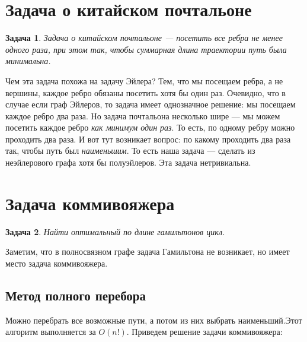 \documentclass[a4paper,12pt]{article}
\newtheorem{problem}{Задача}
\begin{document}
	\section{Задача о китайском почтальоне}
		\begin{problem}
			Задача о китайском почтальоне --- посетить все ребра не менее одного раза, при этом так, чтобы суммарная длина траектории путь была минимальна.
		\end{problem}
		Чем эта задача похожа на задачу Эйлера? Тем, что мы посещаем ребра, а не вершины, каждое ребро обязаны посетить хотя бы один раз. 
		Очевидно, что в случае если граф Эйлеров, то задача имеет однозначное решение: мы посещаем каждое ребро два раза. Но задача почтальона несколько шире --- мы можем посетить каждое ребро \emph{как минимум один раз}.
		То есть, по одному ребру можно проходить два раза. И вот тут возникает вопрос: по какому проходить два раза так, чтобы путь был \emph{наименьшим}. То есть наша задача --- сделать из неэйлерового графа хотя бы полуэйлеров.
		Эта задача нетривиальна.
		
	\section{Задача коммивояжера}
		\begin{problem}
			Найти оптимальный по длине гамильтонов цикл.
		\end{problem}
		
		Заметим, что в полносвязном графе задача Гамильтона не возникает, но имеет место задача коммивояжера.
		
		\subsection{Метод полного перебора}
			Можно перебрать все возможные пути, а потом из них выбрать наименьший.Этот алгоритм выполняется за $O(n!)$. 
			Приведем решение задачи коммивояжера:
			
\end{document}
